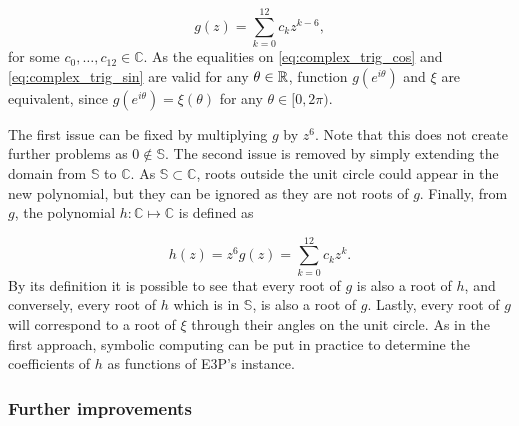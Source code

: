 \begin{equation}
g(z)=\sum_{k=0}^{12} c_k z^{k-6},
\end{equation}
for some $c_0, \dots, c_{12} \in \mathbb{C}$. As the equalities on \autoref{eq:complex_trig_cos} and \autoref{eq:complex_trig_sin} are valid for any $\theta \in \mathbb{R}$, function $g(e^{i\theta})$ and $\xi$ are equivalent, since $g(e^{i\theta}) = \xi(\theta)$ for any $\theta \in [0, 2\pi)$. 

The first issue can be fixed by multiplying $g$ by $z^6$. Note that this does not create further problems as $0\not\in \mathbb{S}$. The second issue is removed by simply extending the domain from $\mathbb{S}$ to $\mathbb{C}$. 
As $\mathbb{S} \subset \mathbb{C}$, roots outside the unit circle could appear in the new polynomial, but they can be ignored as they are not roots of $g$.
Finally, from $g$, the polynomial $h : \mathbb{C} \mapsto \mathbb{C}$ is defined as

\begin{equation}\label{eq:h}
h(z) = z^6 g(z) = \sum_{k=0}^{12} c_k z^k.
\end{equation}
By its definition it is possible to see that every root of $g$ is also a root of $h$, and conversely, every root of $h$ which is in $\mathbb{S}$, is also a root of $g$. Lastly, every root of $g$ will correspond to a root of $\xi$ through their angles on the unit circle. As in the first approach, symbolic computing can be put in practice to determine the coefficients of $h$ as functions of E3P's instance.

\subsubsection{Further improvements}


